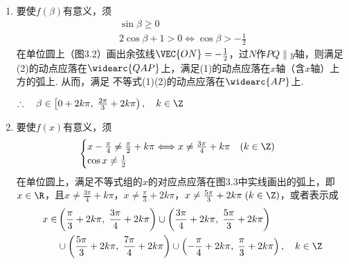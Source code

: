 \begin{solution}
\begin{enumerate}[(1)]
\item 要使$f(\beta)$有意义，须
\begin{align}
    \sin\beta\ge 0 \tag{1}\\
    2\cos\beta +1>0\Longleftrightarrow \cos\beta>-\frac{1}{2}\tag{2}
\end{align}
在单位圆上（图3.2）画出余弦线$\VEC{ON}=-\frac{1}{2}$，过$N$作$PQ\parallel y$轴，则满足(2)的动点应落在$\widearc{QAP}$上，满足(1)的动点应落在$x$轴（含$x$轴）上方的弧上. 从而，满足 不等式(1)(2)的动点应落在$\widearc{AP}$上.

$\therefore\quad \beta\in \left[0+2k\pi,\; \frac{2\pi}{3}+2k\pi\right),\quad k\in\Z$

\item 要使$f(x)$有意义，须
\[\begin{cases}
    x-\frac{\pi}{4}\ne\frac{\pi}{2}+k\pi\Longleftrightarrow x\ne \frac{3\pi}{4}+k\pi\quad (k\in\Z)\\
    \cos x\ne \frac{1}{2}
\end{cases}\]
在单位圆上，满足不等式组的$x$的对应点应落在图3.3中实线画出的弧上，即$x\in\R$，且$x\ne \frac{3\pi}{4}+k\pi$，$x\ne \frac{\pi}{3}+2k\pi$，$x\ne \frac{5\pi}{3}+2k\pi\; (k\in\Z)$，或者表示成
\[\begin{split}
x\in &\left(\frac{\pi}{3}+2k\pi,\; \frac{3\pi}{4}+2k\pi\right)\cup \left(\frac{3\pi}{4}+2k\pi,\; \frac{5\pi}{3}+2k\pi\right)\\
&\cup \left(\frac{5\pi}{3}+2k\pi,\; \frac{7\pi}{4}+2k\pi\right)\cup \left(-\frac{\pi}{4}+2k\pi,\; \frac{\pi}{3}+2k\pi\right),\quad k\in\Z
\end{split}\]


\end{enumerate}
\end{solution}
